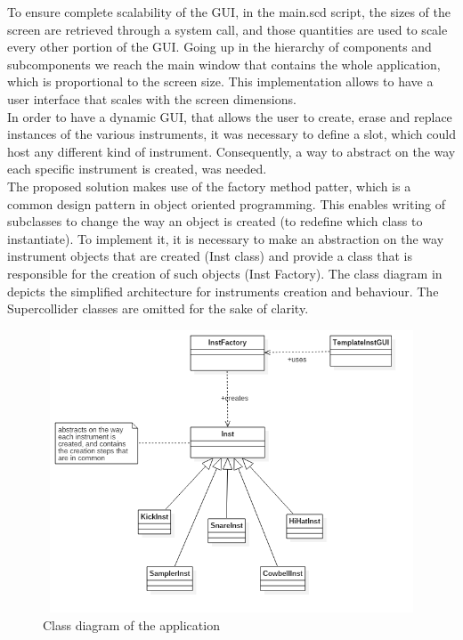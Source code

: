 \documentclass[main.tex]{subfiles}
\begin{document}
To ensure complete scalability of the GUI, in the main.scd script, the sizes of the screen are retrieved through a system call, and those quantities are used to scale every other portion of the GUI. Going up in the hierarchy of components and subcomponents we reach the main window that contains the whole application, which is proportional to the screen size. This implementation allows to have a user interface that scales with the screen dimensions.\\
In order to have a dynamic GUI, that allows the user to create, erase and replace instances of the various instruments, it was necessary to define a slot, which could host any different kind of instrument. Consequently, a way to abstract on the way each specific instrument is created, was needed.\\ 
The proposed solution makes use of the factory method patter, which is a common design pattern in object oriented programming. This enables writing of subclasses to change the way an object is created (to redefine which class to instantiate)\cite{DesignPattern:Gamma}. 
To implement it, it is necessary to make an abstraction on the way instrument objects that are created (Inst class) and provide a class that is responsible for the creation of such objects (Inst Factory).
The class diagram in  depicts the simplified architecture for instruments creation and behaviour. The Supercollider classes are omitted for the sake of clarity.\\
\begin{figure}[htbp]
\centering
\includegraphics[height=8.4cm, width=16cm, keepaspectratio]{images/factory_pattern_uml.png}
\caption{Class diagram of the application}
\label{fig:uml}
\end{figure}
\end{document}
